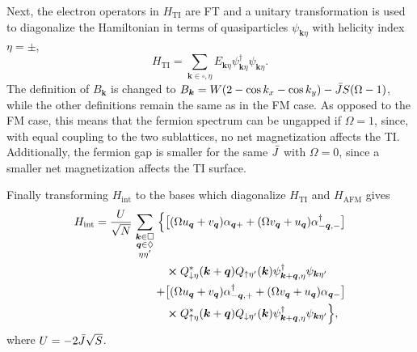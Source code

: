 \documentclass[aps, prb, twocolumn,amsmath,amssymb,floatfix]{revtex4-2}
\begin{document}
Next, the electron operators in $H_{\textrm{TI}}$ are FT and a unitary transformation is used to diagonalize the Hamiltonian in terms of quasiparticles $\psi_{\boldsymbol{k}\eta}$ with helicity index $\eta = \pm$,
\begin{equation}
     H_{\textrm{TI}} = \sum_{\boldsymbol{k}\in \square, \eta} E_{\boldsymbol{k}\eta} \psi_{\boldsymbol{k}\eta}^\dagger \psi_{\boldsymbol{k}\eta}.
\end{equation}
The definition of $B_{\boldsymbol{k}}$ is changed to $B_{\boldsymbol{k}} = W(2-\cos k_x - \cos k_y) -\Bar{J}S(\Omega-1)$, while the other definitions remain the same as in the FM case. As opposed to the FM case, this means that the fermion spectrum can be ungapped if $\Omega = 1$, since, with equal coupling to the two sublattices, no net magnetization affects the TI. Additionally, the fermion gap is smaller for the same $\Bar{J}$ with $\Omega = 0$, since a smaller net magnetization affects the TI surface.


Finally transforming $H_{\textrm{int}}$ to the bases which diagonalize $H_{\textrm{TI}}$ and $H_{\textrm{AFM}}$ gives
\begin{align}
\label{eq:HintAFM}
    H_{\textrm{int}} = \frac{U}{\sqrt{N}} \sum_{\begin{smallmatrix} \boldsymbol{k} \in \square \\  \boldsymbol{q} \in \Diamond \\ \eta\eta'  \end{smallmatrix}} \Big\{ &\big[ (\Omega u_{\boldsymbol{q}} + v_{\boldsymbol{q}}) \alpha_{\boldsymbol{q}+} + (\Omega v_{\boldsymbol{q}}+u_{\boldsymbol{q}})\alpha_{-\boldsymbol{q},-}^\dagger \big] \nonumber \\
    &\cross Q_{\downarrow \eta}^* (\boldsymbol{k}+\boldsymbol{q}) Q_{\uparrow \eta'}(\boldsymbol{k})  \psi_{\boldsymbol{k}+\boldsymbol{q}, \eta}^\dagger \psi_{\boldsymbol{k}\eta'}  \nonumber \\
    +&\big[ (\Omega u_{\boldsymbol{q}} + v_{\boldsymbol{q}}) \alpha_{-\boldsymbol{q},+}^\dagger + (\Omega v_{\boldsymbol{q}}+u_{\boldsymbol{q}})\alpha_{\boldsymbol{q}-} \big] \nonumber \\
    &\cross Q_{\uparrow \eta}^* (\boldsymbol{k}+\boldsymbol{q}) Q_{\downarrow \eta'}(\boldsymbol{k})  \psi_{\boldsymbol{k}+\boldsymbol{q}, \eta}^\dagger \psi_{\boldsymbol{k}\eta'} \Big\},
\end{align}
where $U = -2\Bar{J}\sqrt{S}$.
\end{document}
